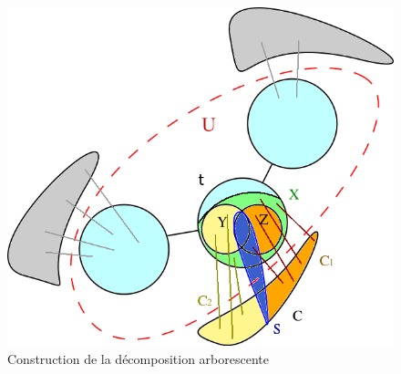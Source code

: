 
\begin{figure}[H]
\begin{center}
\includegraphics[scale=0.4]{res/twbuild}
\end{center}
\caption{Construction de la décomposition arborescente}
\label{fig_twbuild}
\end{figure}


